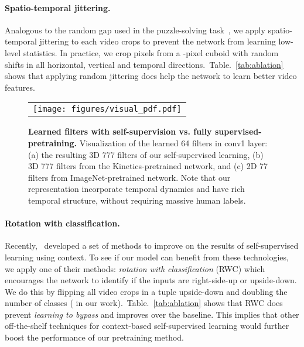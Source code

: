 \documentclass[letterpaper]{article} \usepackage{aaai19}  \usepackage{times}  \usepackage{helvet}  \usepackage{courier}  \usepackage{url}  \usepackage{graphicx}  \frenchspacing  \setlength{\pdfpagewidth}{8.5in}  \setlength{\pdfpageheight}{11in}
\newcommand{\tabref}[1]{Table.~\ref{#1}}
\begin{document}
\noindent \paragraph{Spatio-temporal jittering.} \quad Analogous to the random gap used in the puzzle-solving task~\cite{noroozi2016unsupervised}, we apply spatio-temporal jittering to each video crops to prevent the network from learning low-level statistics. In practice, we crop  pixels from a -pixel cuboid with random shifts in all horizontal, vertical and temporal directions.~\tabref{tab:ablation} shows that applying random jittering does help the network to learn better video features.




\begin{figure*}[t]
\begin{center}
\def\arraystretch{1.0}
\begin{tabular}{@{}c@{}} 
	\texttt{[image: figures/visual\_pdf.pdf]} \\
\end{tabular}
\end{center}
\caption{\textbf{Learned filters with self-supervision vs. fully supervised-pretraining.} Visualization of the learned 64 filters in conv1 layer: (a) the resulting 3D 777 filters of our self-supervised learning, (b) 3D 777 filters from the Kinetics-pretrained network, and (c) 2D 77 filters from ImageNet-pretrained network. Note that our representation incorporate temporal dynamics and have rich temporal structure, without requiring massive human labels.  }
\label{fig:visualization}
\end{figure*}




\noindent \paragraph{Rotation with classification.} \quad Recently,~\cite{nathan2018improvements} developed a set of methods to improve on the results of self-supervised learning using context. To see if our model can benefit from these technologies, we apply one of their methods: \textit{rotation with classification} (RWC) which encourages the network to identify if the inputs are right-side-up or upside-down. We do this by flipping all video crops in a tuple upside-down and doubling the number of classes ( in our work).~\tabref{tab:ablation} shows that RWC does prevent \textit{learning to bypass} and improves over the baseline. This implies that other off-the-shelf techniques for context-based self-supervised learning would further boost the performance of our pretraining method.
\end{document}
